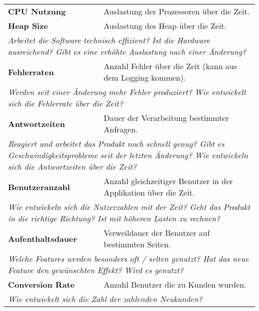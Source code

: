   \begin{table}[H]
    \centering
    \begin{tabular}{p{5cm}p{9.5cm}} \toprule
    \textbf{CPU Nutzung} & Auslastung der Prozessoren über die Zeit. \\
    \textbf{Heap Size} & Auslastung des Heap über die Zeit. \\
    \multicolumn{2}{p{14.5cm}}{\textit{Arbeitet die Software technisch effizient? \newline Ist die Hardware ausreichend? \newline Gibt es eine erhöhte Auslastung nach einer Änderung?}} \\ \midrule
    \textbf{Fehlerraten} & Anzahl Fehler über die Zeit (kann aus dem Logging kommen). \\
    \multicolumn{2}{p{14.5cm}}{\textit{Werden seit einer Änderung mehr Fehler produziert? \newline Wie entwickelt sich die Fehlerrate über die Zeit?}} \\ \midrule
    \textbf{Antwortzeiten} & Dauer der Verarbeitung bestimmter Anfragen. \\
    \multicolumn{2}{p{14.5cm}}{\textit{Reagiert und arbeitet das Produkt noch schnell genug? \newline Gibt es Geschwindigkeitsprobleme seit der letzten Änderung? \newline Wie entwickeln sich die Antwortzeiten über die Zeit?}} \\ \midrule
    \textbf{Benutzeranzahl} & Anzahl gleichzeitiger Benutzer in der Applikation über die Zeit. \\
    \multicolumn{2}{p{14.5cm}}{\textit{Wie entwickeln sich die Nutzerzahlen mit der Zeit? \newline Geht das Produkt in die richtige Richtung? \newline Ist mit höheren Lasten zu rechnen?}} \\ \midrule
    \textbf{Aufenthaltsdauer} & Verweildauer der Benutzer auf bestimmten Seiten. \\
    \multicolumn{2}{p{14.5cm}}{\textit{Welche Features werden besonders oft / selten genutzt? \newline Hat das neue Feature den gewünschten Effekt? Wird es genutzt?}} \\ \midrule
    \textbf{Conversion Rate} & Anzahl Benutzer die zu Kunden wurden. \\
    \multicolumn{2}{p{14.5cm}}{\textit{Wie entwickelt sich die Zahl der zahlenden Neukunden?}} \\ \midrule

\end{tabular}
\end{table}
